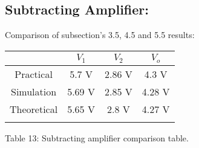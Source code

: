 \subsection{Subtracting Amplifier:}

Comparison of subsection's 3.5, 4.5 and 5.5 results: \hfill \break

\begin{center}
\begin{tabular}[.5cm]{c c c c}
\toprule
\toprule
& \hspace{55pt} $V_{1}$ \hspace{55pt} & \hspace{55pt} $V_{2}$ \hspace{55pt} & \hspace{55pt} $V_{o}$ \hspace{55pt}  \\
\midrule
\midrule
Practical & 5.7 V & 2.86 V & 4.3 V \\
\cmidrule{1-4}
Simulation & 5.69 V & 2.85 V & 4.28 V \\
\cmidrule{1-4}
Theoretical & 5.65 V & 2.8 V & 4.27 V \\
\bottomrule
\linebreak
\end{tabular}
\linebreak Table 13: Subtracting amplifier comparison table.
\end{center} \hfill

\pagebreak